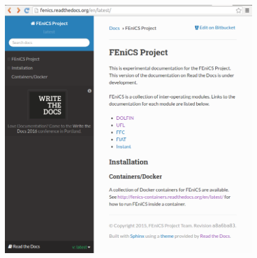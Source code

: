 \begin{frame}
  \begin{center}
     {\includegraphics[width=0.80\textwidth]{png/fenics-readthedocs-webpage-1.png}}
    \small
  \end{center}
\end{frame}
